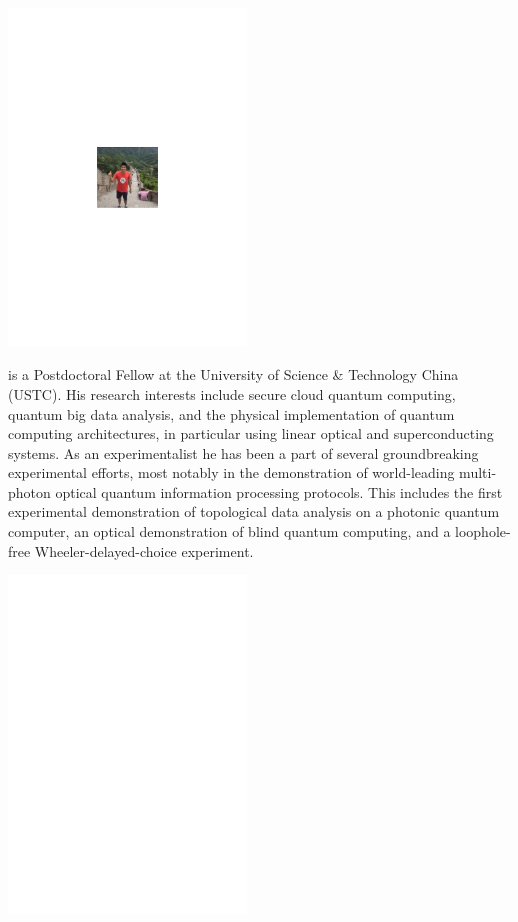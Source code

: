 \begin{center}
\includegraphics[clip=true, width=0.475\textwidth]{photo_heliang_huang}
\end{center}

 is a Postdoctoral Fellow at the University of Science \& Technology China (USTC). His research interests include secure cloud quantum computing, quantum big data analysis, and the physical implementation of quantum computing architectures, in particular using linear optical and superconducting systems. As an experimentalist he has been a part of several groundbreaking experimental efforts, most notably in the demonstration of world-leading multi-photon optical quantum information processing protocols. This includes the first experimental demonstration of topological data analysis on a photonic quantum computer, an optical demonstration of blind quantum computing, and a loophole-free Wheeler-delayed-choice experiment.

%
%

\begin{center}
\includegraphics[clip=true, width=0.475\textwidth]{photo_zuen_su}
\end{center}

